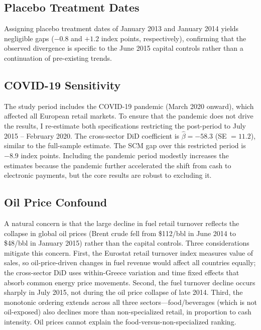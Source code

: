 \documentclass[12pt]{article}
\begin{document}
\subsection{Placebo Treatment Dates}

Assigning placebo treatment dates of January 2013 and January 2014 yields negligible gaps ($-0.8$ and $+1.2$ index points, respectively), confirming that the observed divergence is specific to the June 2015 capital controls rather than a continuation of pre-existing trends.

\subsection{COVID-19 Sensitivity}

The study period includes the COVID-19 pandemic (March 2020 onward), which affected all European retail markets. To ensure that the pandemic does not drive the results, I re-estimate both specifications restricting the post-period to July 2015 -- February 2020. The cross-sector DiD coefficient is $\hat{\beta} = -58.3$ (SE $= 11.2$), similar to the full-sample estimate. The SCM gap over this restricted period is $-8.9$ index points. Including the pandemic period modestly increases the estimates because the pandemic further accelerated the shift from cash to electronic payments, but the core results are robust to excluding it.


\subsection{Oil Price Confound}

A natural concern is that the large decline in fuel retail turnover reflects the collapse in global oil prices (Brent crude fell from \$112/bbl in June 2014 to \$48/bbl in January 2015) rather than the capital controls. Three considerations mitigate this concern. First, the Eurostat retail turnover index measures value of sales, so oil-price-driven changes in fuel revenue would affect all countries equally; the cross-sector DiD uses within-Greece variation and time fixed effects that absorb common energy price movements. Second, the fuel turnover decline occurs sharply in July 2015, not during the oil price collapse of late 2014. Third, the monotonic ordering extends across all three sectors---food/beverages (which is not oil-exposed) also declines more than non-specialized retail, in proportion to cash intensity. Oil prices cannot explain the food-versus-non-specialized ranking.
\end{document}
